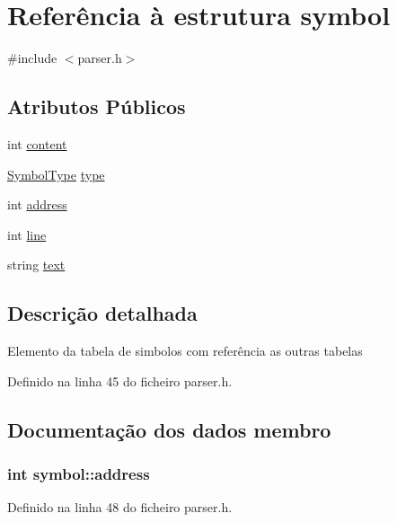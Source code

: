 \hypertarget{structsymbol}{\section{Referência à estrutura symbol}
\label{structsymbol}
}


{\ttfamily \#include $<$parser.\-h$>$}

\subsection*{Atributos Públicos}
\begin{DoxyCompactItemize}
\item 
int \hyperlink{structsymbol_a72c61f7152e8fadf84f1d13136ba741b}{content}
\item 
\hyperlink{parser_8h_add8909e1085c0c32f8380ff493a243b3}{Symbol\-Type} \hyperlink{structsymbol_adba0eaeb4bfbf4787bd3899e4202cc90}{type}
\item 
int \hyperlink{structsymbol_aa61e9dd64d1465422a2b39ca16dc3aca}{address}
\item 
int \hyperlink{structsymbol_a9080179a3d7c5bbfaf9de1817f00c2c7}{line}
\item 
string \hyperlink{structsymbol_ad8fc4d46c20c78f051903a5d06151e86}{text}
\end{DoxyCompactItemize}


\subsection{Descrição detalhada}
Elemento da tabela de simbolos com referência as outras tabelas 

Definido na linha 45 do ficheiro parser.\-h.



\subsection{Documentação dos dados membro}
\hypertarget{structsymbol_aa61e9dd64d1465422a2b39ca16dc3aca}{
\subsubsection[{address}]{\setlength{\rightskip}{0pt plus 5cm}int symbol\-::address}}\label{structsymbol_aa61e9dd64d1465422a2b39ca16dc3aca}


Definido na linha 48 do ficheiro parser.\-h.

